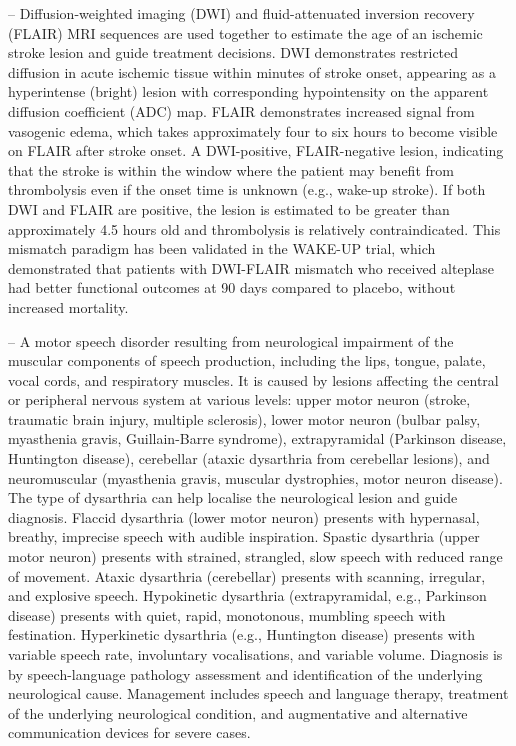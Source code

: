 -- Diffusion-weighted imaging (DWI) and fluid-attenuated inversion recovery (FLAIR) MRI sequences are used together to estimate the age of an ischemic stroke lesion and guide treatment decisions. DWI demonstrates restricted diffusion in acute ischemic tissue within minutes of stroke onset, appearing as a hyperintense (bright) lesion with corresponding hypointensity on the apparent diffusion coefficient (ADC) map. FLAIR demonstrates increased signal from vasogenic edema, which takes approximately four to six hours to become visible on FLAIR after stroke onset. A DWI-positive, FLAIR-negative lesion, indicating that the stroke is within the window where the patient may benefit from thrombolysis even if the onset time is unknown (e.g., wake-up stroke). If both DWI and FLAIR are positive, the lesion is estimated to be greater than approximately 4.5 hours old and thrombolysis is relatively contraindicated. This mismatch paradigm has been validated in the WAKE-UP trial, which demonstrated that patients with DWI-FLAIR mismatch who received alteplase had better functional outcomes at 90 days compared to placebo, without increased mortality.

-- A motor speech disorder resulting from neurological impairment of the muscular components of speech production, including the lips, tongue, palate, vocal cords, and respiratory muscles. It is caused by lesions affecting the central or peripheral nervous system at various levels: upper motor neuron (stroke, traumatic brain injury, multiple sclerosis), lower motor neuron (bulbar palsy, myasthenia gravis, Guillain-Barre syndrome), extrapyramidal (Parkinson disease, Huntington disease), cerebellar (ataxic dysarthria from cerebellar lesions), and neuromuscular (myasthenia gravis, muscular dystrophies, motor neuron disease). The type of dysarthria can help localise the neurological lesion and guide diagnosis. Flaccid dysarthria (lower motor neuron) presents with hypernasal, breathy, imprecise speech with audible inspiration. Spastic dysarthria (upper motor neuron) presents with strained, strangled, slow speech with reduced range of movement. Ataxic dysarthria (cerebellar) presents with scanning, irregular, and explosive speech. Hypokinetic dysarthria (extrapyramidal, e.g., Parkinson disease) presents with quiet, rapid, monotonous, mumbling speech with festination. Hyperkinetic dysarthria (e.g., Huntington disease) presents with variable speech rate, involuntary vocalisations, and variable volume. Diagnosis is by speech-language pathology assessment and identification of the underlying neurological cause. Management includes speech and language therapy, treatment of the underlying neurological condition, and augmentative and alternative communication devices for severe cases.

